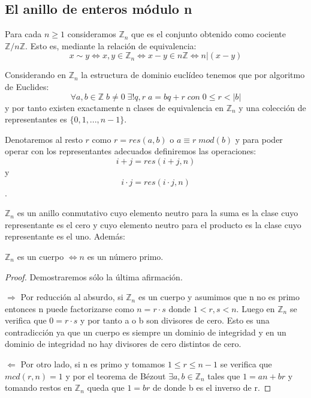 \subsection{El anillo de enteros módulo n}

Para cada $n \ge 1$ consideramos $\mathbb{Z}_n$ que es el conjunto obtenido como cociente $\mathbb{Z}/n\mathbb{Z}$. Esto es, mediante la relación de equivalencia: $$x \sim y \iff x,y \in \mathbb{Z}_n \iff x-y \in n\mathbb{Z} \iff n | (x-y)$$

Considerando en $\mathbb{Z}_n$ la estructura de dominio euclídeo tenemos que por algoritmo de Euclides: $$\forall a,b \in \mathbb{Z} \; b \neq 0 \; \exists! q,r \; a = bq+r \; con \; 0 \leq r < |b| $$ y por tanto existen exactamente n clases de equivalencia en $\mathbb{Z}_n$ y una colección de representantes es $\{0,1,...,n-1\}$.

Denotaremos al resto $r$ como $r = res(a,b)$ o $a \equiv r \; mod(b)$ y para poder operar con los representantes adecuados definiremos las operaciones: $$i+j = res(i+j,n)$$ y $$i \cdot j = res(i \cdot j,n)$$.

\begin{proposition}
$\mathbb{Z}_n$ es un anillo conmutativo cuyo elemento neutro para la suma es la clase cuyo representante es el cero y cuyo elemento neutro para el producto es la clase cuyo representante es el uno. Además:

$\mathbb{Z}_n$ es un cuerpo $\iff n$ es un número primo.
\end{proposition}

\begin{proof}

Demostraremos sólo la última afirmación. 

$\Rightarrow$ Por reducción al absurdo, si $\mathbb{Z}_n$ es un cuerpo y asumimos que n no es primo entonces n puede factorizarse como $n = r \cdot s$ donde $1 < r,s < n$. Luego en $\mathbb{Z}_n$ se verifica que $0 = r \cdot s$ y por tanto a o b son divisores de cero. Esto es una contradicción ya que un cuerpo es siempre un dominio de integridad y en un dominio de integridad no hay divisores de cero distintos de cero.

$\Leftarrow$ Por otro lado, si n es primo y tomamos $1 \leq r \leq n-1$ se verifica que $mcd(r,n) = 1$ y por el teorema de Bézout $\exists a,b \in \mathbb{Z}_n$ tales que $1 = an + br$ y tomando restos en $\mathbb{Z}_n$ queda que $1 = br$ de donde b es el inverso de r.

\end{proof}

